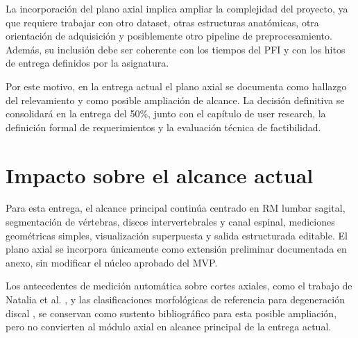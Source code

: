 La incorporación del plano axial implica ampliar la complejidad del proyecto, ya que requiere trabajar con otro dataset, otras estructuras anatómicas, otra orientación de adquisición y posiblemente otro pipeline de preprocesamiento. Además, su inclusión debe ser coherente con los tiempos del PFI y con los hitos de entrega definidos por la asignatura.

Por este motivo, en la entrega actual el plano axial se documenta como hallazgo del relevamiento y como posible ampliación de alcance. La decisión definitiva se consolidará en la entrega del 50\%, junto con el capítulo de user research, la definición formal de requerimientos y la evaluación técnica de factibilidad.

\section{Impacto sobre el alcance actual}

Para esta entrega, el alcance principal continúa centrado en RM lumbar sagital, segmentación de vértebras, discos intervertebrales y canal espinal, mediciones geométricas simples, visualización superpuesta y salida estructurada editable. El plano axial se incorpora únicamente como extensión preliminar documentada en anexo, sin modificar el núcleo aprobado del MVP.

Los antecedentes de medición automática sobre cortes axiales, como el trabajo de Natalia et al. \parencite{natalia_measurement_2020}, y las clasificaciones morfológicas de referencia para degeneración discal \parencite{pfirrmann_disc_degeneration_2001}, se conservan como sustento bibliográfico para esta posible ampliación, pero no convierten al módulo axial en alcance principal de la entrega actual.
